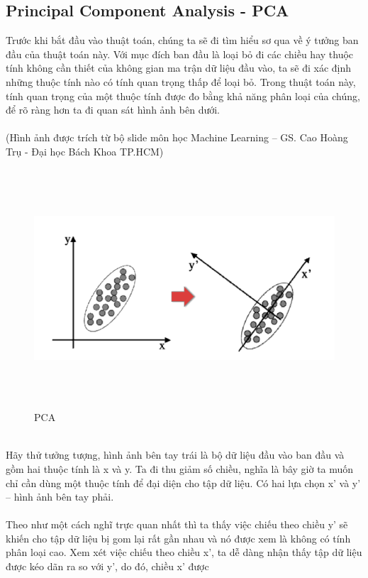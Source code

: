 \subsection{Principal Component Analysis - PCA}
Trước khi bắt đầu vào thuật toán, chúng ta sẽ đi tìm hiểu sơ qua về ý tưởng ban
đầu của thuật toán này. Với mục đích ban đầu là loại bỏ đi các chiều hay thuộc
tính không cần thiết của không gian ma trận dữ liệu đầu vào, ta sẽ đi xác định
những thuộc tính nào có tính quan trọng thấp để loại bỏ. Trong thuật toán này,
tính quan trọng của một thuộc tính được đo bằng khả năng phân loại của chúng, để
rõ ràng hơn ta đi quan sát hình ảnh bên dưới.\\\\ 
(Hình ảnh được trích từ
bộ slide môn học Machine Learning – GS. Cao Hoàng Trụ - Đại học Bách Khoa
TP.HCM)\\
\begin{figure}[h!]
  	\centering
	\includegraphics[width=5in,height=3.5in,keepaspectratio=true]{PCA.png}
	\caption{PCA}
\end{figure}\\
Hãy thử tưởng tượng, hình ảnh bên tay trái là bộ dữ liệu đầu vào ban đầu và gồm
hai thuộc tính là x và y. Ta đi thu giảm số chiều, nghĩa là bây giờ ta muốn chỉ
cần dùng một thuộc tính để đại diện cho tập dữ liệu. Có hai lựa chọn x’ và y’ –
hình ảnh bên tay phải.\\\\ 
Theo như một cách nghĩ trực quan nhất thì ta
thấy việc chiếu theo chiều y’ sẽ khiến cho tập dữ liệu bị gom lại rất gần nhau
và nó được xem là không có tính phân loại cao. Xem xét việc chiếu theo chiều x’,
ta dễ dàng nhận thấy tập dữ liệu được kéo dãn ra so với y’, do đó, chiều x’ được
